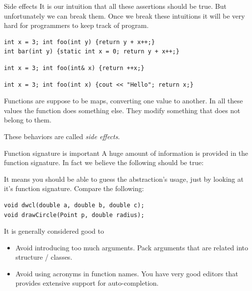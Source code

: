 \begin{frame}[fragile]{Side effects}
It is our intuition that all these assertions should be true. But unfortunately we can break them. Once we break these intuitions it will be very hard for programmers to keep track of program.

\begin{verbatim}
int x = 3; int foo(int y) {return y + x++;}
int bar(int y) {static int x = 0; return y + x++;}
\end{verbatim}
\begin{verbatim}
int x = 3; int foo(int& x) {return ++x;}
\end{verbatim}
\begin{verbatim}
int x = 3; int foo(int x) {cout << "Hello"; return x;}
\end{verbatim}

Functions are suppose to be maps, converting one value to another. In all these values the function does something else. They modify something that does not belong to them. 

These behaviors are called \textit{side effects}.
\end{frame}

\begin{frame}[fragile]{Function signature is important}
A huge amount of information is provided in the function signature. In fact we believe the following should be true:
\begin{center}
\end{center}
It means you should be able to guess the abstraction's usage, just by looking at it's function signature. Compare the following:
\begin{verbatim}
void dwcl(double a, double b, double c);
void drawCircle(Point p, double radius);
\end{verbatim}
It is generally considered good to 
\begin{itemize}
	\item Avoid introducing too much arguments. Pack arguments that are related into structure / classes.
	\item Avoid using acronyms in function names. You have very good editors that provides extensive support for auto-completion.
\end{itemize}
\end{frame}

